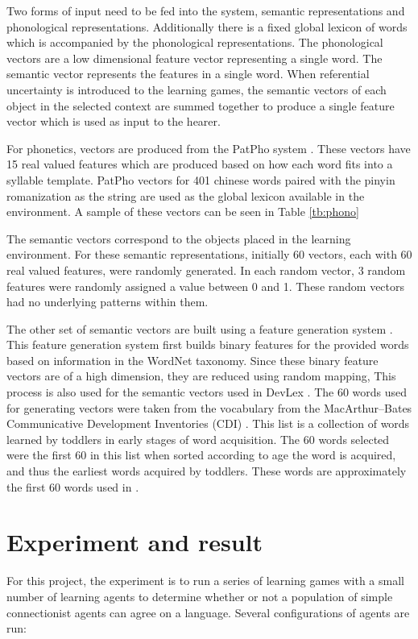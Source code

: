 \documentclass[a4paper,11pt]{article}
\begin{document}
Two forms of input need to be fed into the system, semantic representations and
phonological representations.  Additionally there is a fixed global lexicon of
words which is accompanied by the phonological representations.  The
phonological vectors are a low dimensional feature vector representing a single
word.  The semantic vector represents the features in a single word.  When
referential uncertainty is introduced to the learning games, the semantic
vectors of each object in the selected context are summed together to produce a
single feature vector which is used as input to the hearer.

For phonetics, vectors are produced from the PatPho system \cite{LiPatPho}.
These vectors have 15 real valued features which are produced based on how each
word fits into a syllable template.  PatPho vectors for 401 chinese words paired
with the pinyin romanization as the string are used as the global lexicon
available in the environment.  A sample of these vectors can be seen in Table
\ref{tb:phono}

The semantic vectors correspond to the objects placed in the learning
environment.  For these semantic representations, initially 60 vectors, each
with 60 real valued features, were randomly generated.  In each random vector, 3
random features were randomly assigned a value between 0 and 1.  These random
vectors had no underlying patterns within them.

The other set of semantic vectors are built using a feature generation system
\cite{HarmWordNetFeature}.  This feature generation system first builds binary
features for the provided words based on information in the WordNet taxonomy.
Since these binary feature vectors are of a high dimension, they are reduced
using random mapping, This process is also used for the semantic vectors used in
DevLex \cite{LiDevLex}.  The 60 words used for generating vectors were taken
from the vocabulary from the MacArthur–Bates Communicative Development
Inventories (CDI) \cite{DaleCDI}.  This list is a collection of words learned by
toddlers in early stages of word acquisition.  The 60 words selected were the
first 60 in this list when sorted according to age the word is acquired, and
thus the earliest words acquired by toddlers.  These words are approximately the
first 60 words used in \cite{LiDevLex}.

\section{Experiment and result}
For this project, the experiment is to run a series of learning games with a
small number of learning agents to determine whether or not a population of
simple connectionist agents can agree on a language.  Several configurations of
agents are run:
\end{document}
